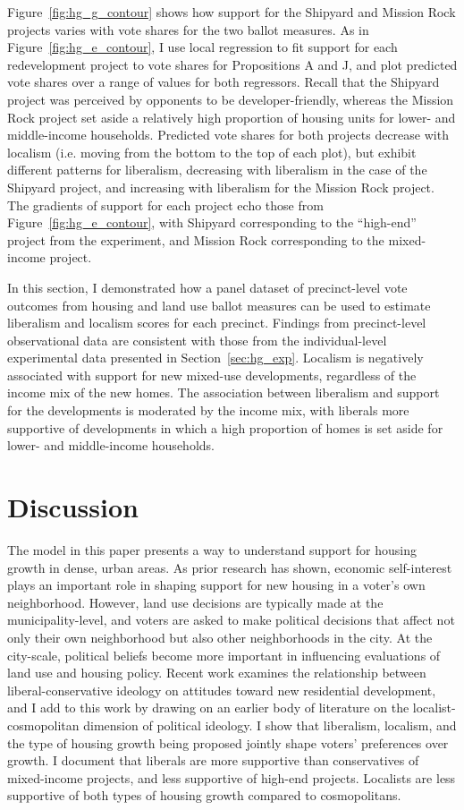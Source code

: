 \documentclass[article,12pt]{memoir}
\begin{document}
Figure~\ref{fig:hg_g_contour} shows how support for the Shipyard and Mission Rock projects varies with vote shares for the two ballot measures.  As in Figure~\ref{fig:hg_e_contour}, I use local regression to fit support for each redevelopment project to vote shares for Propositions A and J, and plot predicted vote shares over a range of values for both regressors.  Recall that the Shipyard project was perceived by opponents to be developer-friendly, whereas the Mission Rock project set aside a relatively high proportion of housing units for lower- and middle-income households.  Predicted vote shares for both projects decrease with localism (i.e. moving from the bottom to the top of each plot), but exhibit different patterns for liberalism, decreasing with liberalism in the case of the Shipyard project, and increasing with liberalism for the Mission Rock project. The gradients of support for each project echo those from Figure~\ref{fig:hg_e_contour}, with Shipyard corresponding to the ``high-end'' project from the experiment, and Mission Rock corresponding to the mixed-income project.  

In this section, I demonstrated how a panel dataset of precinct-level vote outcomes from housing and land use ballot measures can be used to estimate liberalism and localism scores for each precinct. Findings from precinct-level observational data are consistent with those from the individual-level experimental data presented in Section~\ref{sec:hg_exp}. Localism is negatively associated with support for new mixed-use developments, regardless of the income mix of the new homes. The association between liberalism and support for the developments is moderated by the income mix, with liberals more supportive of developments in which a high proportion of homes is set aside for lower- and middle-income households.

\section{Discussion}\label{sec:hg_discussion}

The model in this paper presents a way to understand support for housing growth in dense, urban areas. As prior research has shown, economic self-interest plays an important role in shaping support for new housing in a voter's own neighborhood. However, land use decisions are typically made at the municipality-level, and voters are asked to make political decisions that affect not only their own neighborhood but also other neighborhoods in the city. At the city-scale, political beliefs become more important in influencing evaluations of land use and housing policy. Recent work examines the relationship between liberal-conservative ideology on attitudes toward new residential development, and I add to this work by drawing on an earlier body of literature on the localist-cosmopolitan dimension of political ideology. I show that liberalism, localism, and the type of housing growth being proposed jointly shape voters' preferences over growth. I document that liberals are more supportive than conservatives of mixed-income projects, and less supportive of high-end projects. Localists are less supportive of both types of housing growth compared to cosmopolitans.
\end{document}
